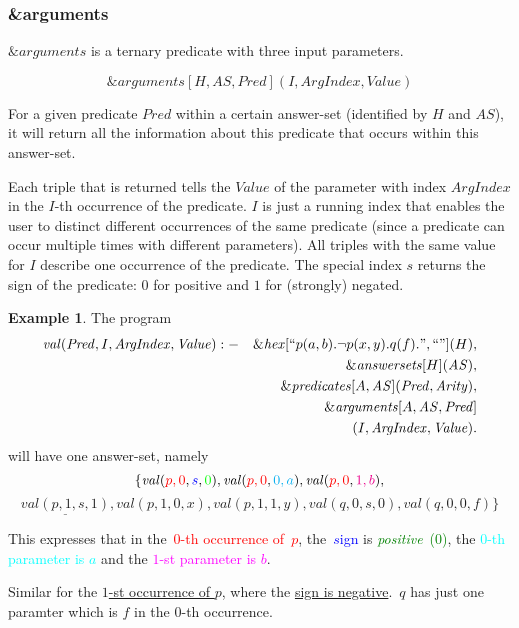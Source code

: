 \documentclass[a4paper,11pt]{article}
\theoremstyle{definition}
\newtheorem{example}{Example}
\newenvironment{mathprogram}[1][P]
	{
		\renewcommand{\ruleimplication}{&:-&}
		\newcommand{\ruledelimiter}{1}
		\begin{eqnarray*}
	}
	{
		\end{eqnarray*}
	}
\newcommand{\ruleimplication}{\ensuremath{\mathit{:-}}}
\begin{document}
				
		\subsubsection{\&arguments}

			$\mathit{\&arguments}$ is a ternary predicate with three input parameters.
			
				$$\mathit{\&arguments}[H, \mathit{AS}, \mathit{Pred}](\mathit{I}, \mathit{ArgIndex}, \mathit{Value})$$
				
			For a given predicate $\mathit{Pred}$ within a certain answer-set (identified by $H$ and $\mathit{AS}$), it will return all the information about this predicate that occurs
			within this answer-set.
			
			Each triple that is returned tells the $\mathit{Value}$ of the parameter with index $\mathit{ArgIndex}$ in the $I$-th occurrence of the predicate. $I$
			is just a running index that enables the user to distinct different occurrences of the same predicate (since a predicate can occur multiple times with different parameters). All
			triples with the same value for $I$ describe one occurrence of the predicate. The special index $s$ returns the sign of the predicate: $0$ for positive and $1$ for (strongly)
			negated.
				
			\begin{example}
				\label{ex:arguments}
				The program
				\begin{mathprogram}
\mathit{val}(\mathit{Pred}, I, \mathit{ArgIndex}, \mathit{Value}) \ruleimplication \mathit{\&hex}[``p(a,b). \neg p(x,y). q(f).", ``"](H), \\
					&&																\mathit{\&answersets}[H](\mathit{AS}), \\
					&&																\mathit{\&predicates}[A, \mathit{AS}](\mathit{Pred}, \mathit{Arity}), \\
					&&																\mathit{\&arguments}[A, \mathit{AS}, \mathit{Pred}] \\
					&&																\ \ \ \ \ (I, \mathit{ArgIndex}, \mathit{Value}).
				\end{mathprogram}
				will have one answer-set, namely
					$$\{ \mathit{val}(\textcolor{red}{p,0},\textcolor{blue}{s},\textcolor{green}{0}), \mathit{val}(\textcolor{red}{p,0},\textcolor{cyan}{0,a}), \mathit{val}(\textcolor{red}{p,0},\textcolor{magenta}{1,b}),$$
					$$\underline{\mathit{val}(p,1,s,1)}, \mathit{val}(p,1,0,x), \mathit{val}(p,1,1,y), \mathit{val}(q,0,s,0), \mathit{val}(q,0,0,f) \}$$
				
				This expresses that in the~\textcolor{red}{$0$-th occurrence of~$p$}, the~\textcolor{blue}{$s$ign} is \textcolor{green}{\emph{positive}~($0$)}, the \textcolor{cyan}{$0$-th parameter is $a$} and the \textcolor{magenta}{$1$-st parameter is $b$}.
				
				Similar for the \underline{$1$-st occurrence of $p$}, where the \underline{sign is negative}.~$q$ has just one paramter which is $f$ in the $0$-th occurrence.
			\end{example}
\end{document}
